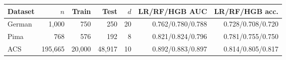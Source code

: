 \begin{tabular}{lrrrrrr}
\toprule
Dataset & $n$ & Train & Test & $d$ & LR/RF/HGB AUC & LR/RF/HGB acc. \\
\midrule
German & 1,000 & 750 & 250 & 20 & 0.762/0.780/0.788 & 0.728/0.708/0.720 \\
Pima & 768 & 576 & 192 & 8 & 0.821/0.824/0.796 & 0.781/0.755/0.750 \\
ACS & 195,665 & 20,000 & 48,917 & 10 & 0.892/0.883/0.897 & 0.814/0.805/0.817 \\
\bottomrule
\end{tabular}